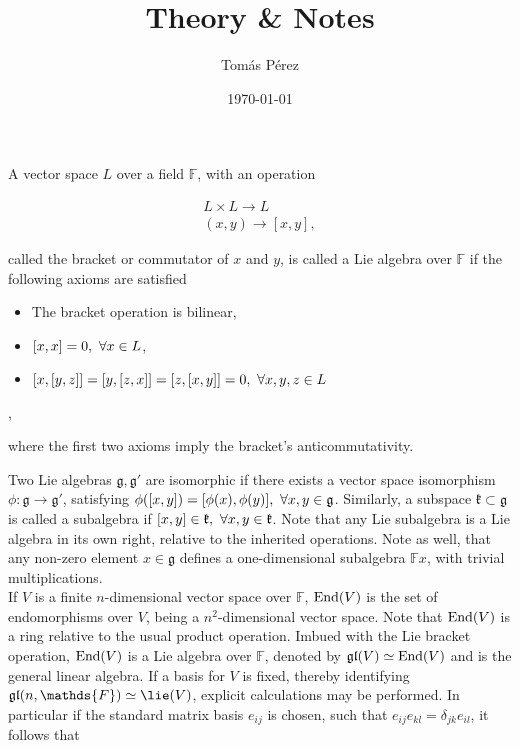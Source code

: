 \documentclass{homework}
\author{Tomás Pérez}
\date{\today}
\title{Theory \& Notes}
\begin{document}
 \maketitle

\begin{df}
A vector space $L$ over a field $\mathds{F}$, with an operation 

$$
    \begin{array}{c}
         L \times L \rightarrow L \\
         (x, y) \rightarrow [x,y],
    \end{array}
$$  

called the bracket or commutator of $x$ and $y$, is called a Lie algebra over $\mathds{F}$ if the following axioms are satisfied

\begin{itemize}
    \item The bracket operation is bilinear,
    \item $[x,x] = 0, \textnormal{ } \forall x \in L$,
    \item $[x,[y,z]] = [y, [z,x]] = [z, [x,y]] = 0, \textnormal{ } \forall x,y,z \in L$
\end{itemize},

where the first two axioms imply the bracket's anticommutativity. \\
\end{df}

Two Lie algebras $\mathfrak{g}, \mathfrak{g}'$ are isomorphic if there exists a vector space isomorphism $\phi: \mathfrak{g} \rightarrow \mathfrak{g}'$, satisfying $\phi([x,y]) = [\phi(x), \phi(y)], \textnormal{ } \forall x,y \in \mathfrak{g}$. Similarly, a subspace $\mathfrak{k} \subset \mathfrak{g}$ is called a subalgebra if $[x,y] \in \mathfrak{k}, \textnormal{ } \forall x, y \in \mathfrak{k}$. Note that any Lie subalgebra is a Lie algebra in its own right, relative to the inherited operations. Note as well, that any non-zero element $x \in \mathfrak{g}$ defines a one-dimensional subalgebra $\mathds{F}x$, with trivial multiplications. \\

If $V$ is a finite $n$-dimensional vector space over $\mathds{F}$, $\textnormal{End}(V)$ is the set of endomorphisms over $V$, being a $n^2$-dimensional vector space. Note that $\textnormal{End}(V)$ is a ring relative to the usual product operation. Imbued with the Lie bracket operation, $\textnormal{End}(V)$ is a Lie algebra over $\mathds{F}$, denoted by $\mathfrak{g}\mathfrak{l}(V) \simeq \textnormal{End}(V)$ and is the general linear algebra. If a basis for $V$ is fixed, thereby identifying $\linearalgebra(n, \mathds{F}) \simeq \lie(V)$, explicit calculations may be performed. In particular if the standard matrix basis $e_{ij}$ is chosen, such that 
$e_{ij} e_{kl} = \delta_{jk} e_{il}$, it follows that 
\end{document}
